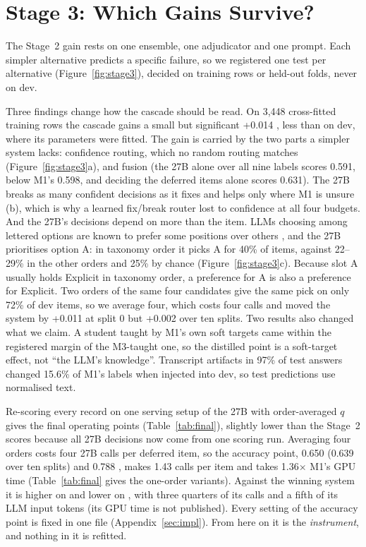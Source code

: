 \section{Stage 3: Which Gains Survive?}
\label{sec:robust}
\FigureStageThree

The Stage~2 gain rests on one ensemble, one adjudicator and one prompt. Each simpler alternative predicts a specific failure, so we registered one test per alternative (Figure~\ref{fig:stage3}), decided on training rows or held-out folds, never on dev.

Three findings change how the cascade should be read.
On 3,448 cross-fitted training rows the cascade gains a small but significant +0.014 , less than on dev, where its parameters were fitted.
The gain is carried by the two parts a simpler system lacks: confidence routing, which no random routing matches (Figure~\ref{fig:stage3}a), and fusion (the 27B alone over all nine labels scores 0.591, below M1's 0.598, and deciding the deferred items alone scores 0.631).
The 27B breaks as many confident decisions as it fixes and helps only where M1 is unsure (b), which is why a learned fix/break router lost to confidence at all four budgets.
And the 27B's decisions depend on more than the item.
LLMs choosing among lettered options are known to prefer some positions over others \citep{zheng2024large}, and the 27B prioritises option A: in taxonomy order it picks A for 40\% of items, against 22--29\% in the other orders and 25\% by chance (Figure~\ref{fig:stage3}c). Because slot A usually holds Explicit in taxonomy order, a preference for A is also a preference for Explicit. Two orders of the same four candidates give the same pick on only 72\% of dev items, so we average four, which costs four calls and moved the system by +0.011 at split 0 but +0.002 over ten splits.
Two results also changed what we claim. A student taught by M1's own soft targets came within the registered margin of the M3-taught one, so the distilled point is a soft-target effect, not ``the LLM's knowledge''. Transcript artifacts in 97\% of test answers changed 15.6\% of M1's labels when injected into dev, so test predictions use normalised text.

Re-scoring every record on one serving setup of the 27B with order-averaged $q$ gives the final operating points (Table~\ref{tab:final}), slightly lower than the Stage~2 scores because all 27B decisions now come from one scoring run.
Averaging four orders costs four 27B calls per deferred item, so the accuracy point, 0.650 \Stwo{} (0.639 over ten splits) and 0.788 \Sone{}, makes 1.43 calls per item and takes 1.36$\times$ M1's GPU time (Table~\ref{tab:final} gives the one-order variants).
Against the winning system it is higher on \Stwo{} and lower on \Sone{}, with three quarters of its calls and a fifth of its LLM input tokens (its GPU time is not published).
Every setting of the accuracy point is fixed in one file (Appendix~\ref{sec:impl}). From here on it is the \emph{instrument}, and nothing in it is refitted.

